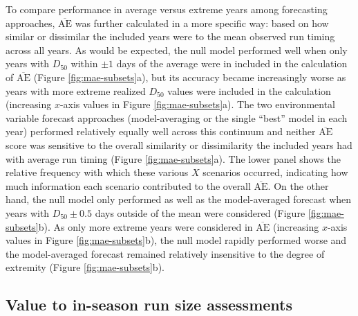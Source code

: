 \documentclass[12pt,]{book}
\theoremstyle{definition}
\theoremstyle{definition}
\theoremstyle{definition}
\theoremstyle{remark}
\begin{document}
To compare performance in average versus extreme years among forecasting
approaches, \(\overline{\text{AE}}\) was further calculated in a more
specific way: based on how similar or dissimilar the included years were
to the mean observed run timing across all years. As would be expected,
the null model performed well when only years with \(D_{50}\) within
\(\pm 1\) days of the average were in included in the calculation of
\(\overline{\text{AE}}\) (Figure \ref{fig:mae-subsets}a), but its
accuracy became increasingly worse as years with more extreme realized
\(D_{50}\) values were included in the calculation (increasing
\(x\)-axis values in Figure \ref{fig:mae-subsets}a). The two
environmental variable forecast approaches (model-averaging or the
single ``best'' model in each year) performed relatively equally well
across this continuum and neither \(\overline{\text{AE}}\) score was
sensitive to the overall similarity or dissimilarity the included years
had with average run timing (Figure \ref{fig:mae-subsets}a). The lower
panel shows the relative frequency with which these various \(X\)
scenarios occurred, indicating how much information each scenario
contributed to the overall \(\overline{\text{AE}}\). On the other hand,
the null model only performed as well as the model-averaged forecast
when years with \(D_{50} \pm 0.5\) days outside of the mean were
considered (Figure \ref{fig:mae-subsets}b). As only more extreme years
were considered in \(\overline{\text{AE}}\) (increasing \(x\)-axis
values in Figure \ref{fig:mae-subsets}b), the null model rapidly
performed worse and the model-averaged forecast remained relatively
insensitive to the degree of extremity (Figure \ref{fig:mae-subsets}b).

\subsection{Value to in-season run size
assessments}\label{value-to-in-season-run-size-assessments}
\end{document}
